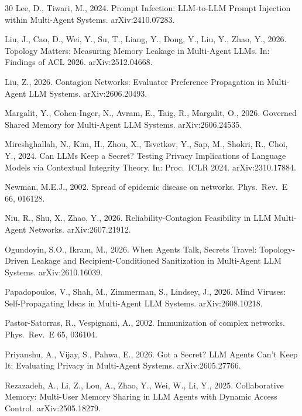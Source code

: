 \documentclass[preprint,12pt,authoryear]{elsarticle}
\begin{document}
\begin{thebibliography}{30}
Lee, D., Tiwari, M., 2024. Prompt Infection: LLM-to-LLM Prompt Injection within Multi-Agent Systems. arXiv:2410.07283.

Liu, J., Cao, D., Wei, Y., Su, T., Liang, Y., Dong, Y., Liu, Y., Zhao, Y., 2026. Topology Matters: Measuring Memory Leakage in Multi-Agent LLMs. In: Findings of ACL 2026. arXiv:2512.04668.

Liu, Z., 2026. Contagion Networks: Evaluator Preference Propagation in Multi-Agent LLM Systems. arXiv:2606.20493.

Margalit, Y., Cohen-Inger, N., Avram, E., Taig, R., Margalit, O., 2026. Governed Shared Memory for Multi-Agent LLM Systems. arXiv:2606.24535.

Mireshghallah, N., Kim, H., Zhou, X., Tsvetkov, Y., Sap, M., Shokri, R., Choi, Y., 2024. Can LLMs Keep a Secret? Testing Privacy Implications of Language Models via Contextual Integrity Theory. In: Proc.\ ICLR 2024. arXiv:2310.17884.

Newman, M.E.J., 2002. Spread of epidemic disease on networks. Phys.\ Rev.\ E 66, 016128.

Niu, R., Shu, X., Zhao, Y., 2026. Reliability-Contagion Feasibility in LLM Multi-Agent Networks. arXiv:2607.21912.

Ogundoyin, S.O., Ikram, M., 2026. When Agents Talk, Secrets Travel: Topology-Driven Leakage and Recipient-Conditioned Sanitization in Multi-Agent LLM Systems. arXiv:2610.16039.

Papadopoulos, V., Shah, M., Zimmerman, S., Lindsey, J., 2026. Mind Viruses: Self-Propagating Ideas in Multi-Agent LLM Systems. arXiv:2608.10218.

Pastor-Satorras, R., Vespignani, A., 2002. Immunization of complex networks. Phys.\ Rev.\ E 65, 036104.

Priyanshu, A., Vijay, S., Pahwa, E., 2026. Got a Secret? LLM Agents Can't Keep It: Evaluating Privacy in Multi-Agent Systems. arXiv:2605.27766.

Rezazadeh, A., Li, Z., Lou, A., Zhao, Y., Wei, W., Li, Y., 2025. Collaborative Memory: Multi-User Memory Sharing in LLM Agents with Dynamic Access Control. arXiv:2505.18279.


\end{thebibliography}
\end{document}
